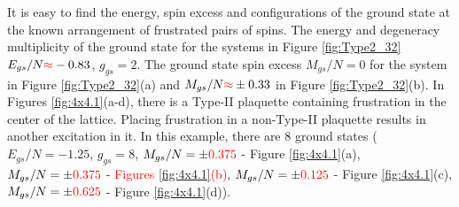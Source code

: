 \documentclass[preprint,12pt]{elsarticle}
\begin{document}
	
	It is easy to find the energy, spin excess and configurations of the ground state at the known arrangement of frustrated pairs of spins. The energy and degeneracy multiplicity of the ground state for the systems in Figure \ref{fig:Type2_32} $E_{gs}/N\textcolor{red}{\approx}-0.83$, $g_{gs}=2$. The ground state spin excess $M_{gs}/N=0$ for the system in Figure \ref{fig:Type2_32}(a) and $M_{gs}/N\textcolor{red}{\approx}\pm 0.33$ in Figure \ref{fig:Type2_32}(b).
	In Figures \ref{fig:4x4.1}(a-d), there is a Type-II plaquette containing frustration in the center of the lattice. Placing frustration in a non-Type-II plaquette results in another excitation in it. In this example, there are 8 ground states ($E_{gs}/N=-1.25$, $g_{gs}=8$, $M_{gs}/N=\pm\textcolor{red}{0.375}$ - Figure \ref{fig:4x4.1}(a), $M_{gs}/N=\pm \textcolor{red}{0.375}$ - \textcolor{red}{Figures \ref{fig:4x4.1}(b)}, $M_{gs}/N=\pm \textcolor{red}{0.125}$ - Figure \ref{fig:4x4.1}(c), $M_{gs}/N=\pm \textcolor{red}{0.625}$ - Figure \ref{fig:4x4.1}(d)). 
	
\end{document}
